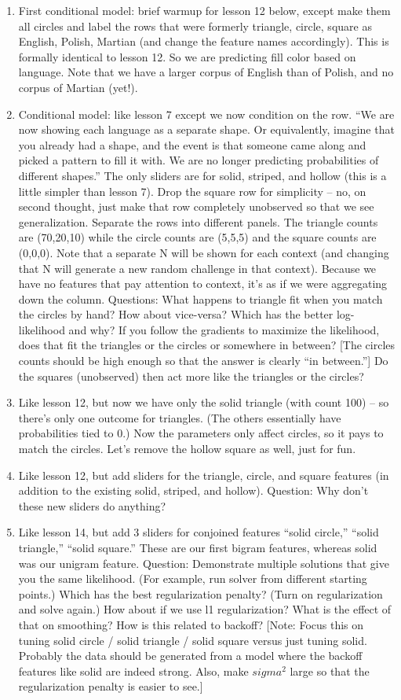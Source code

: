 \documentclass[11pt,letterpaper]{article}
\begin{document}
\begin{enumerate}
\item First conditional model: brief warmup for lesson 12 below, except make them all circles and label the rows that were formerly triangle, circle, square as English, Polish, Martian (and change the feature names accordingly).  This is formally identical to lesson 12.  So we are predicting fill color based on language.  Note that we have a larger corpus of English than of Polish, and no corpus of Martian (yet!).
\item Conditional model: like lesson 7 except we now condition on the row.  “We are now showing each language as a separate shape.  Or equivalently, imagine that you already had a shape, and the event is that someone came along and picked a pattern to fill it with.  We are no longer predicting probabilities of different shapes.”  The only sliders are for solid, striped, and hollow (this is a little simpler than lesson 7).  Drop the square row for simplicity -- no, on second thought, just make that row completely unobserved so that we see generalization.  Separate the rows into different panels.  The triangle counts are (70,20,10) while the circle counts are (5,5,5) and the square counts are (0,0,0).   Note that a separate N will be shown for each context (and changing that N will generate a new random challenge in that context).  Because we have no features that pay attention to context, it’s as if we were aggregating down the column.  
Questions: What happens to triangle fit when you match the circles by hand?  How about vice-versa?  Which has the better log-likelihood and why?  If you follow the gradients to maximize the likelihood, does that fit the triangles or the circles or somewhere in between?  [The circles counts should be high enough so that the answer is clearly “in between.”]   Do the squares (unobserved) then act more like the triangles or the circles?
\item Like lesson 12, but now we have only the solid triangle (with count 100) -- so there’s only one outcome for triangles.  (The others essentially have probabilities tied to 0.)  Now the parameters only affect circles, so it pays to match the circles.  Let’s remove the hollow square as well, just for fun.
\item Like lesson 12, but add sliders for the triangle, circle, and square features (in addition to the existing solid, striped, and hollow).  Question: Why don’t these new sliders do anything?
\item Like lesson 14, but add 3 sliders for conjoined features “solid circle,” “solid triangle,” “solid square.”  These are our first bigram features, whereas solid was our unigram feature.  Question: Demonstrate multiple solutions that give you the same likelihood.  (For example, run solver from different starting points.)  Which has the best regularization penalty?   (Turn on regularization and solve again.)  How about if we use l1 regularization?  What is the effect of that on smoothing?  How is this related to backoff?  [Note: Focus this on tuning solid circle / solid triangle / solid square versus just tuning solid.  Probably the data should be generated from a model where the backoff features like solid are indeed strong.  Also, make $sigma^2$ large so that the regularization penalty is easier to see.]

\end{enumerate}
\end{document}
